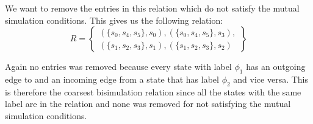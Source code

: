 \documentclass[12pt]{report}
\begin{document}
We want to remove the entries in this relation which do not satisfy the mutual simulation conditions. This gives us the following relation:\\
$$R = \left\{
	\begin{array}{c}
	    (\{s_0,s_4,s_5\},s_0),(\{s_0,s_4,s_5\},s_3),\\
	    (\{s_1,s_2,s_3\},s_1), (\{s_1,s_2,s_3\},s_2)
	\end{array}
\right\}$$

Again no entries was removed because every state with label $\phi_1$ has an outgoing edge to and an incoming edge from a state that has label $\phi_2$ and vice versa. This is therefore the coarsest bisimulation relation since all the states with the same label are in the relation and none was removed for not satisfying the mutual simulation conditions.
\end{document}
